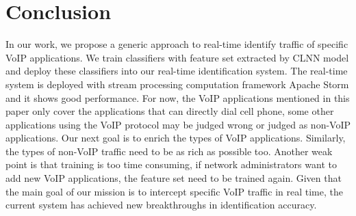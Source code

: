 \documentclass[conference]{IEEEtran}
\begin{document}
\section{Conclusion}
\label{sec:conclusion}
In our work, we propose a generic approach to real-time identify traffic of specific VoIP applications. We train classifiers with feature set extracted by CLNN model and deploy these classifiers into our real-time identification system. The real-time system is deployed with stream processing computation framework Apache Storm and it shows good performance. For now, the VoIP applications mentioned in this paper only cover the applications that can directly dial cell phone, some other applications using the VoIP protocol may be judged wrong or judged as non-VoIP applications. Our next goal is to enrich the types of VoIP applications. Similarly, the types of non-VoIP traffic need to be as rich as possible too. Another weak point is that training is too time consuming, if network administrators want to add new VoIP applications, the feature set need to be trained again. Given that the main goal of our mission is to intercept specific VoIP traffic in real time, the current system has achieved new breakthroughs in identification accuracy.




\end{document}
